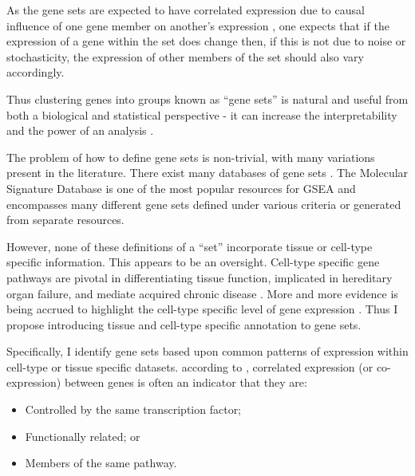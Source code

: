 \documentclass[12pt]{article} %
\begin{document}
	As the gene sets are expected to have correlated expression due to causal influence of one gene member on another's expression \citep{WeirauchGeneCoexpressionNetworks2011}, one expects that if the expression of a gene within the set does change then, if this is not due to noise or stochasticity, the expression of other members of the set should also vary accordingly.
	
	Thus clustering genes into groups known as ``gene sets'' is natural and useful from both a biological and statistical perspective - it can increase the interpretability and the power of an analysis \citep{NicaExpressionquantitativetrait2013, VosaUnravelingpolygenicarchitecture2018}.
	
	
	The problem of how to define gene sets is non-trivial, with many variations present in the literature. There exist many databases of gene sets \citep{AshburnerGeneOntologytool2000a, KanehisaNewapproachunderstanding2019, SzklarczykSTRINGv11protein2019}. The Molecular Signature Database \citep{SubramanianGenesetenrichment2005a} is one of the most popular resources for GSEA and encompasses many different gene sets defined under various criteria or generated from separate resources. 
	
	However, none of these definitions of a ``set'' incorporate tissue or cell-type specific information. This appears to be an oversight. Cell-type specific gene pathways are pivotal in differentiating tissue function, implicated in hereditary organ failure, and mediate acquired chronic disease \citep{JuDefiningcelltypespecificity2013a}. More and more evidence is being accrued to highlight the cell-type specific level of gene expression \citep{GrundbergMappingcistransregulatory2012, OngEnhancerfunctionnew2011, ManiatisRegulationinducibletissuespecific1987}. Thus I propose introducing tissue and cell-type specific annotation to gene sets. 
	
	Specifically, I identify gene sets based upon common patterns of expression within cell-type or tissue specific datasets. according to \citet{WeirauchGeneCoexpressionNetworks2011}, correlated expression (or co-expression) between genes is often an indicator that they are:
	\begin{itemize}
		\item Controlled by the same transcription factor;
		\item Functionally related; or
		\item Members of the same pathway.
	\end{itemize}
\end{document}
